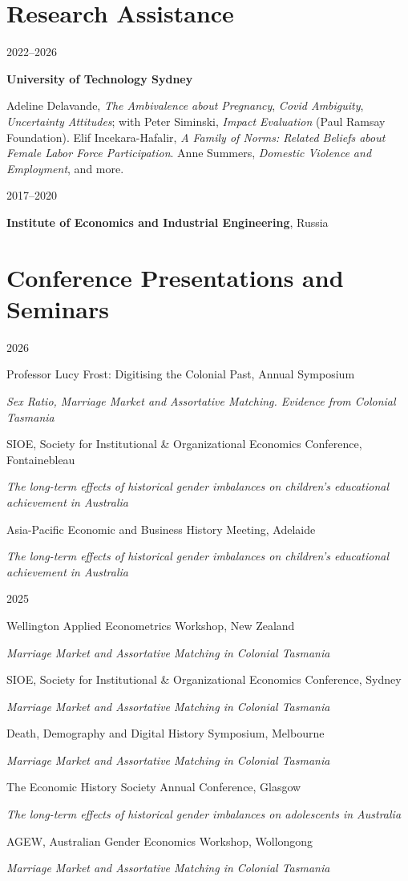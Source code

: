 \documentclass[11pt,a4paper]{article}
\newcommand{\entry}[2]{%
  \begin{minipage}[t]{0.15\textwidth}\raggedright\small #1\end{minipage}%
  \hfill%
  \begin{minipage}[t]{0.83\textwidth}#2\end{minipage}%
  \par\vspace{5pt}}
\begin{document}
\section{Research Assistance}

\entry{2022--2026}{\textbf{University of Technology Sydney}\par
  {\small Adeline Delavande, \emph{The Ambivalence about Pregnancy}, \emph{Covid Ambiguity},
   \emph{Uncertainty Attitudes}; with Peter Siminski, \emph{Impact Evaluation} (Paul Ramsay
   Foundation). Elif Incekara-Hafalir, \emph{A Family of Norms: Related Beliefs about Female
   Labor Force Participation}. Anne Summers, \emph{Domestic Violence and Employment}, and more.}}

\entry{2017--2020}{\textbf{Institute of Economics and Industrial Engineering}, Russia}

\section{Conference Presentations and Seminars}
\newcommand{\pres}[2]{#1\par{\small\emph{#2}}\par\vspace{5pt}}
\entry{2026}{%
  \pres{Professor Lucy Frost: Digitising the Colonial Past, Annual Symposium}
       {Sex Ratio, Marriage Market and Assortative Matching. Evidence from Colonial Tasmania}
  \pres{SIOE, Society for Institutional \& Organizational Economics Conference, Fontainebleau}
       {The long-term effects of historical gender imbalances on children's educational achievement in Australia}
  \pres{Asia-Pacific Economic and Business History Meeting, Adelaide}
       {The long-term effects of historical gender imbalances on children's educational achievement in Australia}}

\entry{2025}{%
  \pres{Wellington Applied Econometrics Workshop, New Zealand}
       {Marriage Market and Assortative Matching in Colonial Tasmania}
  \pres{SIOE, Society for Institutional \& Organizational Economics Conference, Sydney}
       {Marriage Market and Assortative Matching in Colonial Tasmania}
  \pres{Death, Demography and Digital History Symposium, Melbourne}
       {Marriage Market and Assortative Matching in Colonial Tasmania}
  \pres{The Economic History Society Annual Conference, Glasgow}
       {The long-term effects of historical gender imbalances on adolescents in Australia}
  \pres{AGEW, Australian Gender Economics Workshop, Wollongong}
       {Marriage Market and Assortative Matching in Colonial Tasmania}}
\end{document}
